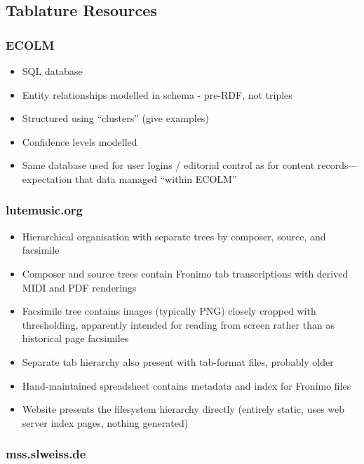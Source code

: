 \documentclass[twocolumn,10pt]{paper}
\begin{document}
\begin{sloppypar}
  \subsection{Tablature Resources}
  
  \subsubsection{ECOLM}

  \begin{itemize}
  \item SQL database
  \item Entity relationships modelled in schema - pre-RDF, not triples
  \item Structured using ``clusters'' (give examples)
  \item Confidence levels modelled
  \item Same database used for user logins / editorial control as for
    content records---expectation that data managed ``within ECOLM''
  \end{itemize}
  
  \subsubsection{lutemusic.org}

  \begin{itemize}
  \item Hierarchical organisation with separate trees by composer,
    source, and facsimile
  \item Composer and source trees contain Fronimo tab transcriptions
    with derived MIDI and PDF renderings
  \item Facsimile tree contains images (typically PNG) closely cropped
    with thresholding, apparently intended for reading from screen
    rather than as historical page facsimiles
  \item Separate tab hierarchy also present with tab-format files,
    probably older
  \item Hand-maintained spreadsheet contains metadata and index for
    Fronimo files
  \item Website presents the filesystem hierarchy directly (entirely
    static, uses web server index pages, nothing generated)
  \end{itemize}    

  \subsubsection{mss.slweiss.de}


\end{sloppypar}
\end{document}
